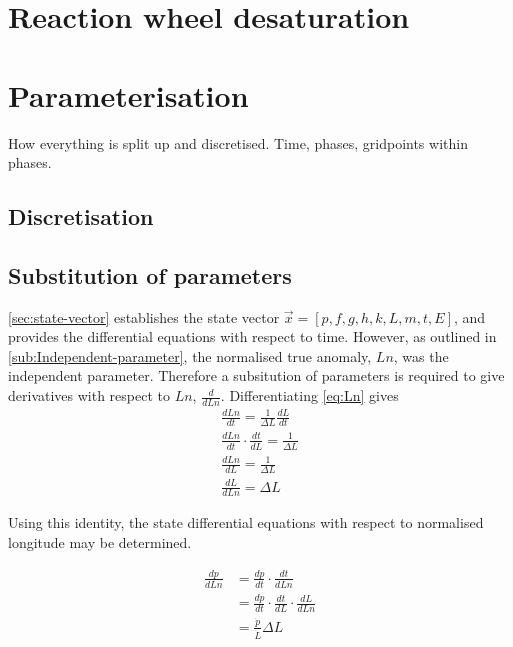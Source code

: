 \section{Reaction wheel desaturation}

\section{Parameterisation}

How everything is split up and discretised. Time, phases, gridpoints within phases. 

\subsection{Discretisation}

\subsection{Substitution of parameters}\label{sub:subst-param}

\autoref{sec:state-vector} establishes the state vector $\vec{x}=[p,f,g,h,k,L,m,t,E]$, and provides the differential equations with respect to time. However, as outlined in \autoref{sub:Independent-parameter}, the normalised true anomaly, $Ln$, was the independent parameter. Therefore a subsitution of parameters is required to give derivatives with respect to $Ln$, $\frac{d}{dLn}$. Differentiating \autoref{eq:Ln} gives
\begin{subequations}
\begin{gather}
\frac{dLn}{dt}=\frac{1}{\Delta L}\frac{dL}{dt} \\
\frac{dLn}{dt}\cdot\frac{dt}{dL}=\frac{1}{\Delta L} \\
\frac{dLn}{dL}=\frac{1}{\Delta L} \\
\frac{dL}{dLn}=\Delta L
\end{gather}
\end{subequations}

Using this identity, the state differential equations with respect to normalised longitude may be determined.

\begin{subequations}
\begin{align}
\frac{dp}{dLn}&=\frac{dp}{dt}\cdot\frac{dt}{dLn}\\
&=\frac{dp}{dt}\cdot\frac{dt}{dL}\cdot\frac{dL}{dLn}\\
&=\frac{\dot{p}}{\dot{L}}\Delta L
\end{align}
\end{subequations}

